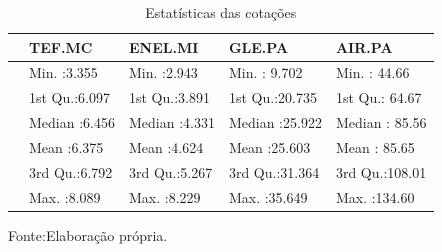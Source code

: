 \documentclass[
  12pt,
  a4paper,
  openany]{book}
\newenvironment{Shaded}{\begin{snugshade}}{\end{snugshade}}
\newcommand{\DataTypeTok}[1]{\textcolor[rgb]{0.13,0.29,0.53}{#1}}
\newcommand{\DecValTok}[1]{\textcolor[rgb]{0.00,0.00,0.81}{#1}}
\newcommand{\KeywordTok}[1]{\textcolor[rgb]{0.13,0.29,0.53}{\textbf{#1}}}
\newcommand{\NormalTok}[1]{#1}
\newcommand{\OperatorTok}[1]{\textcolor[rgb]{0.81,0.36,0.00}{\textbf{#1}}}
\newcommand{\StringTok}[1]{\textcolor[rgb]{0.31,0.60,0.02}{#1}}
\begin{document}
\begin{table}[!h]

\caption{\label{tab:unnamed-chunk-6}Estatísticas das cotações}
\centering
\begin{tabular}[t]{lllll}
\toprule
  &     TEF.MC &    ENEL.MI &     GLE.PA &     AIR.PA\\
\midrule
 & Min.   :3.355 & Min.   :2.943 & Min.   : 9.702 & Min.   : 44.66\\
 & 1st Qu.:6.097 & 1st Qu.:3.891 & 1st Qu.:20.735 & 1st Qu.: 64.67\\
 & Median :6.456 & Median :4.331 & Median :25.922 & Median : 85.56\\
 & Mean   :6.375 & Mean   :4.624 & Mean   :25.603 & Mean   : 85.65\\
 & 3rd Qu.:6.792 & 3rd Qu.:5.267 & 3rd Qu.:31.364 & 3rd Qu.:108.01\\
\addlinespace
 & Max.   :8.089 & Max.   :8.229 & Max.   :35.649 & Max.   :134.60\\
\bottomrule
\end{tabular}
\end{table}
\normalsize
\FloatBarrier
\centering

Fonte:Elaboração própria.

\justifying
\bigskip
\scriptsize

\begin{Shaded}
\end{Shaded}
\end{document}
